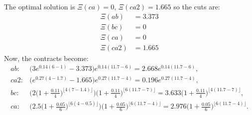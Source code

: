\documentclass[10pt]{article}
\begin{document}
The optimal solution is $\Xi(ca) = 0$, $\Xi(ca2) = 1.665$ so the cuts are:
\begin{align*}
\Xi(ab) &= 3.373\\
\Xi(bc) &= 0\\
\Xi(ca) &= 0\\
\Xi(ca2) &= 1.665
\end{align*}
Now, the contracts become:
\begin{align*}
ab: & \Big( 3e^{ 0.14 ( 6 - 1 ) } - 3.373\Big) e^{ 0.14 (11.7 - 6) } = 2.668 e^{0.14 (11.7 - 6) }, \\
ca2: & \Big( e^{ 0.27 ( 4  - 1.7) } -  1.665 \Big) e^{ 0.27 (11.7 - 4) } = 0.196 e^{0.27 (11.7 - 4)}, \\
bc: & \Big( 2 \Big( 1 + \frac{0.11}{4} \Big)^{ \lfloor 4 ( 7 - 1.4 ) \rfloor } \Big) \Big( 1 + \frac{0.11}{4} \Big)^{ \lfloor 6 (11.7 - 7) \rfloor } = 3.633 \Big( 1 + \frac{0.11}{4} \Big)^{ \lfloor 4 ( 11.7 - 7 ) \rfloor}, \\ 
ca: & \Big( 2.5 \Big( 1 + \frac{0.05}{6} \Big)^{ \lfloor 6 ( 4 - 0.5 ) \rfloor } \Big)\Big( 1 + \frac{0.05}{6} \Big)^{ \lfloor 6 ( 11.7 - 4 ) \rfloor } = 2.976\Big( 1 + \frac{0.05}{6} \Big)^{ \lfloor 6 ( 11.7 - 4 ) \rfloor }.
\end{align*}
\end{document}
